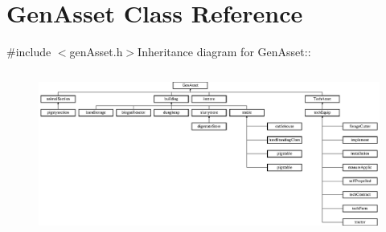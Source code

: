 \hypertarget{class_gen_asset}{
\section{GenAsset Class Reference}
\label{class_gen_asset}
}


{\ttfamily \#include $<$genAsset.h$>$}Inheritance diagram for GenAsset::\begin{figure}[H]
\begin{center}
\leavevmode
\includegraphics[height=5.4321cm]{class_gen_asset}
\end{center}
\end{figure}
